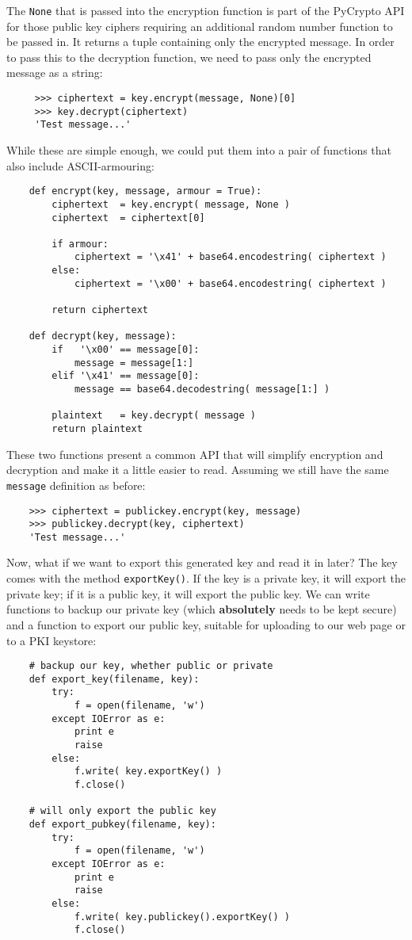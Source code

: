 \documentclass[letterpaper,10pt]{article}
\begin{document}
The \texttt{None} that is passed into the encryption function is part of the 
PyCrypto API for those public key ciphers requiring an additional random number 
function to be passed in. It returns a tuple containing only the encrypted 
message. In order to pass this to the decryption function, we need to pass only 
the encrypted message as a string:
\begin{verbatim}
     >>> ciphertext = key.encrypt(message, None)[0]
     >>> key.decrypt(ciphertext)
     'Test message...'
\end{verbatim}

While these are simple enough, we could put them into a pair of functions that
also include ASCII-armouring:
\begin{verbatim}
    def encrypt(key, message, armour = True):
        ciphertext  = key.encrypt( message, None )
        ciphertext  = ciphertext[0]

        if armour:
            ciphertext = '\x41' + base64.encodestring( ciphertext )
        else:
            ciphertext = '\x00' + base64.encodestring( ciphertext )

        return ciphertext

    def decrypt(key, message):
        if   '\x00' == message[0]:
            message = message[1:]
        elif '\x41' == message[0]:
            message == base64.decodestring( message[1:] )

        plaintext   = key.decrypt( message )
        return plaintext
\end{verbatim}

These two functions present a common API that will simplify encryption and
decryption and make it a little easier to read. Assuming we still have the same
\texttt{message} definition as before:
\begin{verbatim}
    >>> ciphertext = publickey.encrypt(key, message)
    >>> publickey.decrypt(key, ciphertext)
    'Test message...'
\end{verbatim}

Now, what if we want to export this generated key and read it in later? The key
comes with the method \verb|exportKey()|. If the key is a private key, it will
export the private key; if it is a public key, it will export the public key.
We can write functions to backup our private key (which \textbf{absolutely}
needs to be kept secure) and a function to export our public key, suitable for
uploading to our web page or to a PKI keystore:
\begin{verbatim}
    # backup our key, whether public or private
    def export_key(filename, key):
        try:
            f = open(filename, 'w')
        except IOError as e:
            print e
            raise
        else:
            f.write( key.exportKey() )
            f.close()

    # will only export the public key
    def export_pubkey(filename, key):
        try:
            f = open(filename, 'w')
        except IOError as e:
            print e
            raise
        else:
            f.write( key.publickey().exportKey() )
            f.close()
\end{verbatim}
\end{document}
